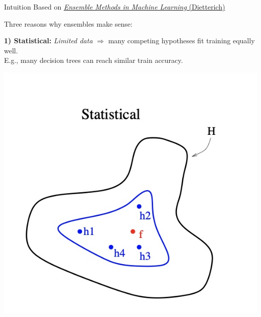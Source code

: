 \documentclass[aspectratio=169,10pt]{beamer}
\newcommand{\fitpic}[1]{\begin{adjustbox}{max width=\linewidth, max totalheight=0.78\textheight}#1\end{adjustbox}}
\begin{document}
\begin{frame}{Intuition}
  \pause Based on \href{https://web.engr.oregonstate.edu/~tgd/publications/mcs-ensembles.pdf}{\emph{Ensemble Methods in Machine Learning} (Dietterich)}
  \vspace{0.3cm}

  Three reasons why ensembles make sense:

  \pause \textbf{1) Statistical:} \textit{Limited data} $\Rightarrow$ many competing hypotheses fit training equally well.\\
  \pause E.g., many decision trees can reach similar train accuracy.

  \vspace{0.5cm}
  \fitpic{\includegraphics[scale=0.2]{../assets/ensemble/diagrams/statistical.jpg}}
\end{frame}
\end{document}
